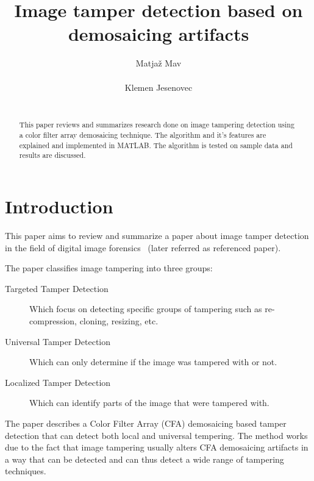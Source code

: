 \documentclass{template/acm_proc_article-sp}
\begin{document}
 

\title{Image tamper detection based on demosaicing artifacts}

\author{
\alignauthor
Matjaž Mav\\
       \\
\alignauthor
Klemen Jesenovec\\
       \\
}

\maketitle
\begin{abstract}
This paper reviews and summarizes research done on image tampering detection
using a color filter array demosaicing technique. The algorithm and it's features are
explained and implemented in MATLAB. The algorithm is tested on sample data and results
are discussed.
\end{abstract}


\section{Introduction}
This paper aims to review and summarize a paper about image tamper 
detection in the field of digital image forensics~\cite{dirik2009image} (later referred as referenced paper).

The paper classifies image tampering into three groups: 
\begin{description}
    \item[Targeted Tamper Detection] Which focus on detecting specific groups of 
    tampering such as re-compression, cloning, resizing, etc. 
    \item[Universal Tamper Detection] Which can only determine if the image
    was tampered with or not.
    \item[Localized Tamper Detection] Which can identify parts of the image 
    that were tampered with.
\end{description}

The paper describes a Color Filter Array (CFA) demosaicing based tamper detection
that can detect both local and universal tempering.
The method works due to the fact that image tampering usually alters CFA demosaicing
artifacts in a way that can be detected and can thus detect a wide range of tampering
techniques. 
\end{document}
